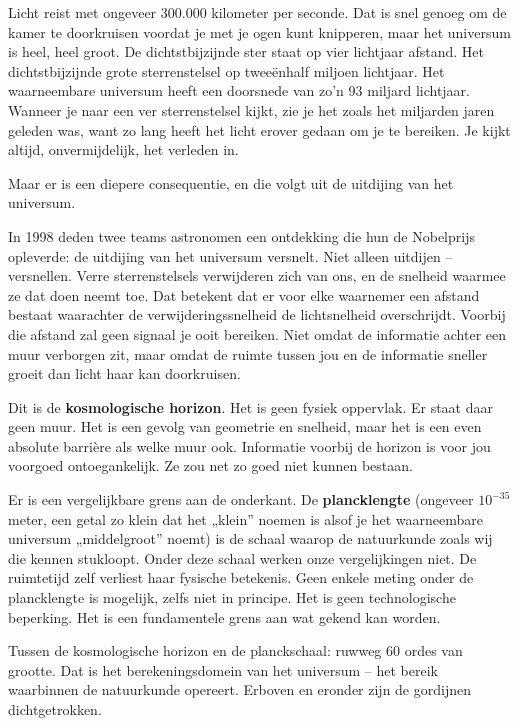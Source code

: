 \documentclass[11pt, twoside, openright]{book}
\begin{document}
Licht reist met ongeveer 300.000 kilometer per seconde. Dat is snel genoeg om de kamer te doorkruisen voordat je met je ogen kunt knipperen, maar het universum is heel, heel groot. De dichtstbijzijnde ster staat op vier lichtjaar afstand. Het dichtstbijzijnde grote sterrenstelsel op tweeënhalf miljoen lichtjaar. Het waarneembare universum heeft een doorsnede van zo'n 93 miljard lichtjaar. Wanneer je naar een ver sterrenstelsel kijkt, zie je het zoals het miljarden jaren geleden was, want zo lang heeft het licht erover gedaan om je te bereiken. Je kijkt altijd, onvermijdelijk, het verleden in.

Maar er is een diepere consequentie, en die volgt uit de uitdijing van het universum.

In 1998 deden twee teams astronomen een ontdekking die hun de Nobelprijs opleverde: de uitdijing van het universum versnelt. Niet alleen uitdijen -- versnellen. Verre sterrenstelsels verwijderen zich van ons, en de snelheid waarmee ze dat doen neemt toe. Dat betekent dat er voor elke waarnemer een afstand bestaat waarachter de verwijderingssnelheid de lichtsnelheid overschrijdt. Voorbij die afstand zal geen signaal je ooit bereiken. Niet omdat de informatie achter een muur verborgen zit, maar omdat de ruimte tussen jou en de informatie sneller groeit dan licht haar kan doorkruisen.

Dit is de \textbf{kosmologische horizon}. Het is geen fysiek oppervlak. Er staat daar geen muur. Het is een gevolg van geometrie en snelheid, maar het is een even absolute barrière als welke muur ook. Informatie voorbij de horizon is voor jou voorgoed ontoegankelijk. Ze zou net zo goed niet kunnen bestaan.

Er is een vergelijkbare grens aan de onderkant. De \textbf{plancklengte} (ongeveer $10^{-35}$ meter, een getal zo klein dat het „klein” noemen is alsof je het waarneembare universum „middelgroot” noemt) is de schaal waarop de natuurkunde zoals wij die kennen stukloopt. Onder deze schaal werken onze vergelijkingen niet. De ruimtetijd zelf verliest haar fysische betekenis. Geen enkele meting onder de plancklengte is mogelijk, zelfs niet in principe. Het is geen technologische beperking. Het is een fundamentele grens aan wat gekend kan worden.

Tussen de kosmologische horizon en de planckschaal: ruwweg 60 ordes van grootte. Dat is het berekeningsdomein van het universum -- het bereik waarbinnen de natuurkunde opereert. Erboven en eronder zijn de gordijnen dichtgetrokken.
\end{document}
